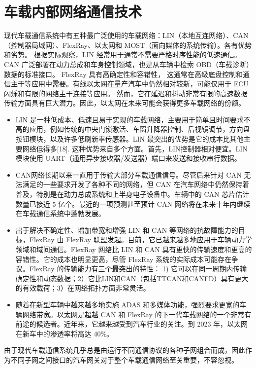 \section*{车载内部网络通信技术}
现代车载通信系统中有五种最广泛使用的车载网络：LIN（本地互连网络）、CAN（控制器局域网）、FlexRay、以太网和 MOST（面向媒体的系统传输）。各有优势和劣势。
根据实际观察，LIN 经常用于通常不需要严格时序性能的低速通信。CAN 广泛部署在动力总成和车身控制领域，也是从车辆中检索 OBD（车载诊断）数据的标准接口。
FlexRay 具有高确定性和容错性，
这通常在高级底盘控制和通信主干等应用中需要。有线以太网在量产汽车中仍然相对较新，可能仅用于 ECU 闪烁和有限的网络主干连接等应用。
然而，它在延迟和抖动非常有限的高速数据传输方面具有巨大潜力。因此，以太网在未来可能会获得更多车载网络的份额。

\begin{itemize}
    \item LIN 是一种低成本、低速且易于实现的车载网络，主要用于简单且时间要求不高的应用，例如传统的中央门锁激活、车窗升降器控制、后视镜调节，方向盘按钮模块，以及许多低刷新率传感器。LIN 最突出的优势是它的成本比其他主要网络低得多[18]. 这种优势来自多个方面。首先，LIN控制器相对便宜。LIN 模块使用 UART（通用异步接收器/发送器）端口来发送和接收串行数据。
    \item CAN网络长期以来一直用于传输大部分车载通信信号。尽管后来针对 CAN 无法满足的一些要求开发了各种不同的网络，但 CAN 在汽车网络中仍然保持着普及，特别是在动力总成系统和上半身电子设备中。车辆中的 CAN 芯片估计数量已接近 5 亿个。最近的一项预测甚至预计 CAN 网络将在未来十年内继续在车载通信系统中蓬勃发展。
    \item 出于解决不确定性、增加带宽和增强 LIN 和 CAN 等网络的抗故障能力的目标，FlexRay 由 FlexRay 联盟发起。目前，它已越来越多地应用于车辆动力学领域和域间通信。FlexRay 网络比 LIN 和 CAN 具有更快的传输速度和更高的容错性。它的成本也明显更高，尽管 FlexRay 系统的实际成本可能存在争议。FlexRay 的传输能力有三个最突出的特性： 1) 它可以在同一周期内传输确定性和动态数据；2）它比LIN和CAN（包括TTCAN和CANFD）具有更大的有效载荷；3）在网络拓扑方面非常灵活。
    \item 随着在新型车辆中越来越多地实施 ADAS 和多媒体功能，强烈要求更宽的车辆网络带宽。以太网是超越 CAN 和 FlexRay 的下一代车载网络的一个非常有前途的候选者。近年来，它越来越受到汽车行业的关注。到 2023 年，以太网在新车中的渗透率将高达 40\%。
\end{itemize}

由于现代车载通信系统几乎总是由运行不同通信协议的各种子网组合而成，因此作为不同子网之间接口的汽车网关对于整个车载通信网络至关重要，不容忽视。

